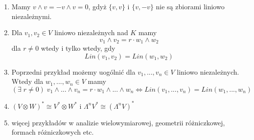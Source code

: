 \begin{enumerate}
  \item Mamy $v\land v=-v\land v=0$, gdyż $\{v, v\}$ i $\{v, -v\}$ nie są zbiorami liniowo niezależnymi.
  \item Dla $v_1,v_2\in V$ liniowo niezależnych nad $K$ mamy
    $$v_1\land v_2=r\cdot w_1\land w_2$$
    dla $r\neq 0$ wtedy i tylko wtedy, gdy
    $$Lin(v_1,v_2)=Lin(w_1,w_2)$$
  \item Poprzedni przykład możemy uogólnić dla $v_1,...,v_n\in V$ liniowo niezależnych. Wtedy dla $w_1,...,w_n\in V$ mamy
    $$(\exists\;r\neq 0)\;v_1\land ...\land v_n=r\cdot w_1\land...\land w_n\iff Lin(v_1,...,v_n)=Lin(w_1,...,w_n)$$
  \item $(V\otimes W)^*\cong V^*\otimes W^*$ i $\Lambda^nV^*\cong (\Lambda^nV)^*$
  \item więcej przykładów w analizie wielowymiarowej, geometrii różniczkowej, formach różniczkowych etc.
\end{enumerate}
